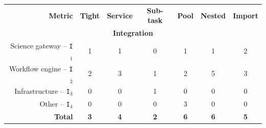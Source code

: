\documentclass[preprint,3p,twocolumn]{elsarticle}
\begin{document}
\begin{table}
\centering
\begin{tabular}{rcccccc}
\textbf{Metric}                      & \textbf{Tight}
                                     & \textbf{Service}
                                     & \textbf{Sub-task}
                                     & \textbf{Pool}
                                     & \textbf{Nested}
                                     & \textbf{Import} \\
\multicolumn{7}{c}{\cellcolor[HTML]{EEEEEE}\textbf{Integration}}\\
Science gateway -- \texttt{I$_1$}    & \cellcolor[HTML]{99FF99}1
                                     & \cellcolor[HTML]{99FF99}1
                                     & \cellcolor[HTML]{99FF99}0  
                                     & \cellcolor[HTML]{99FF99}1
                                     & \cellcolor[HTML]{99FF99}1
                                     & \cellcolor[HTML]{99AA99}2 \\
Workflow engine -- \texttt{I$_2$}    & \cellcolor[HTML]{99AA99}2
                                     & \cellcolor[HTML]{99FF99}3 
                                     & \cellcolor[HTML]{99FF99}1
                                     & \cellcolor[HTML]{99AA99}2
                                     & \cellcolor[HTML]{99AA99}5
                                     & \cellcolor[HTML]{99FF99}3 \\
Infrastructure -- \texttt{I$_3$}   & \cellcolor[HTML]{99FF99}0
                                     & \cellcolor[HTML]{99FF99}0
                                     & \cellcolor[HTML]{99FF99}1
                                     & \cellcolor[HTML]{99AA99}0
                                     & \cellcolor[HTML]{99AA99}0
                                     & \cellcolor[HTML]{99FF99}0 \\
Other -- \texttt{I$_4$}              & \cellcolor[HTML]{99FF99}0
                                     & \cellcolor[HTML]{99FF99}0
                                     & \cellcolor[HTML]{99FF99}0
                                     & \cellcolor[HTML]{99AA99}3
                                     & \cellcolor[HTML]{99AA99}0
                                     & \cellcolor[HTML]{99FF99}0 \\
\textbf{Total}                       & \cellcolor[HTML]{99FF99}\textbf{3}
                                     & \cellcolor[HTML]{99FF99}\textbf{4}
                                     & \cellcolor[HTML]{99FF99}\textbf{2}
                                     & \cellcolor[HTML]{99AA99}\textbf{6}
                                     & \cellcolor[HTML]{99AA99}\textbf{6}
                                     & \cellcolor[HTML]{99AA99}\textbf{5} \\


\end{tabular}
\end{table}
\end{document}
